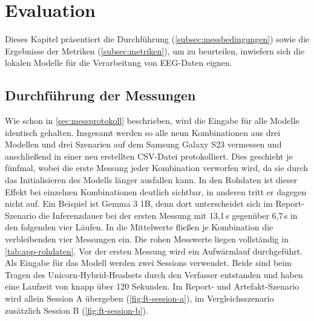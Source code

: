 \chapter{Evaluation}
\label{ch:evaluation}
Dieses Kapitel präsentiert die Durchführung (\autoref{subsec:messbedingungen}) sowie die Ergebnisse der Metriken (\autoref{subsec:metriken}), um zu beurteilen, inwiefern sich die lokalen Modelle für die Verarbeitung von \ac{EEG}-Daten eignen.

\section{Durchführung der Messungen}
\label{sec:eval-durchfuehrung}
Wie schon in \autoref{sec:messprotokoll} beschrieben, wird die Eingabe für alle Modelle identisch gehalten. Insgesamt werden so alle neun Kombinationen aus drei Modellen und drei Szenarien auf dem Samsung Galaxy S23 vermessen und anschließend in einer neu erstellten \ac{CSV}-Datei protokolliert. Dies geschieht je fünfmal, wobei die erste Messung jeder Kombination verworfen wird, da sie durch das Initialisieren des Modells länger ausfallen kann. In den Rohdaten ist dieser Effekt bei einzelnen Kombinationen deutlich sichtbar, in anderen tritt er dagegen nicht auf. Ein Beispiel ist Gemma 3 1B, denn dort unterscheidet sich im Report-Szenario die Inferenzdauer bei der ersten Messung mit 13,1\,s gegenüber 6,7\,s in den folgenden vier Läufen. In die Mittelwerte fließen je Kombination die verbleibenden vier Messungen ein. Die rohen Messwerte liegen vollständig in \autoref{tab:app-rohdaten}.
Vor der ersten Messung wird ein Aufwärmlauf durchgeführt.
Als Eingabe für das Modell werden zwei Sessions verwendet. Beide sind beim Tragen des Unicorn-Hybrid-Headsets durch den Verfasser entstanden und haben eine Laufzeit von knapp über 120 Sekunden. Im Report- und Artefakt-Szenario wird allein Session A übergeben (\autoref{fig:ft-session-a}), im Vergleichsszenario zusätzlich Session B (\autoref{fig:ft-session-b}).

